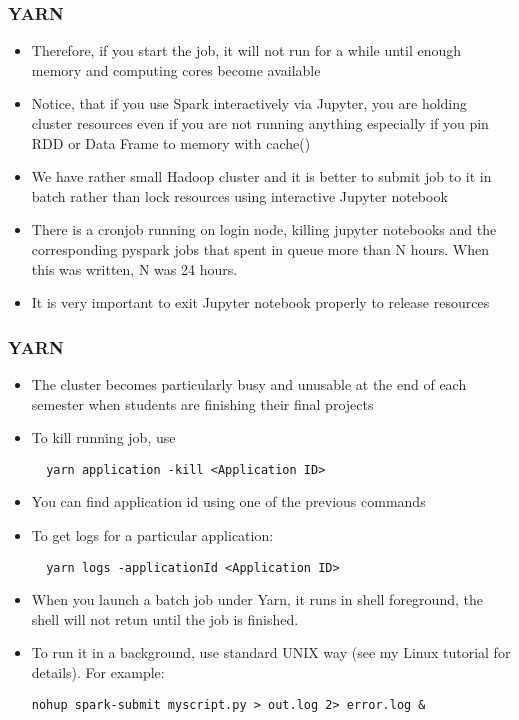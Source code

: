 \documentclass{beamer}
\begin{document}
\begin{frame}[fragile]
  \frametitle{YARN}
  \begin{itemize}
  \item Therefore, if you start the job, it will not run for a while until enough memory and computing cores become available
  \item Notice, that if you use Spark interactively via Jupyter, you are holding cluster resources even if you are not running anything
    especially if you pin RDD or Data Frame to memory with {\color{mycolorcode}cache()}
  \item We have rather small Hadoop cluster and it is better to submit job to it in batch rather than lock resources using
    interactive Jupyter notebook
  \item There is a cronjob running on login node, killing jupyter notebooks and the corresponding pyspark jobs that spent in queue more
    than N hours. When this was written, N was 24 hours.
  \item It is very important to exit Jupyter notebook properly to release resources
  \end{itemize}
\end{frame}


\begin{frame}[fragile]
  \frametitle{YARN}
  \begin{itemize}
  \item The cluster becomes particularly busy and unusable at the end of each semester when students are finishing their final projects
  \item To kill running job, use
    {\color{mycolorcli}
\begin{verbatim}
  yarn application -kill <Application ID>
\end{verbatim}
    }
  \item You can find application id using one of the previous commands
  \item To get logs for a particular application:
    {\color{mycolorcli}
\begin{verbatim}
  yarn logs -applicationId <Application ID>
\end{verbatim}
    }
  \item When you launch a batch job under Yarn, it runs in shell foreground, the shell will not retun until the job is finished.
  \item To run it in a background, use standard UNIX way (see my Linux tutorial for details). For example:
    {\color{mycolorcli}
\begin{verbatim}
nohup spark-submit myscript.py > out.log 2> error.log &
\end{verbatim}        
} 
  \end{itemize}
\end{frame}
\end{document}
